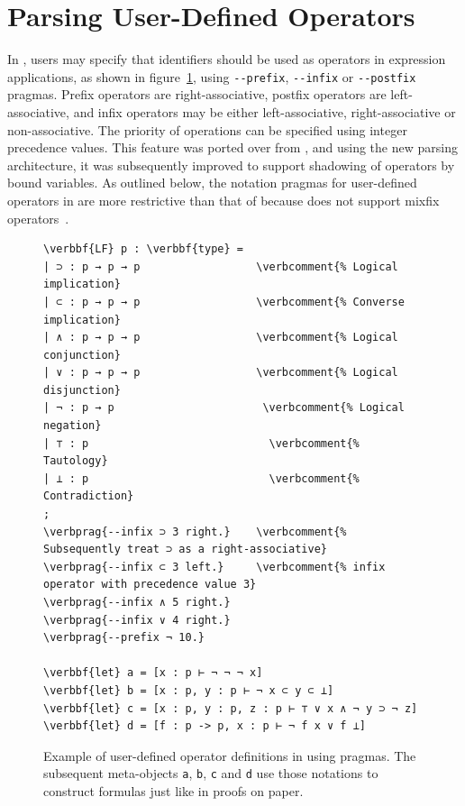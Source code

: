 

\section{Parsing User-Defined Operators}

In \Beluga, users may specify that identifiers should be used as operators in expression applications, as shown in figure~\ref{figure:operator-pragmas}, using \verb|--prefix|, \verb|--infix| or \verb|--postfix| pragmas.
Prefix operators are right-associative, postfix operators are left-associative, and infix operators may be either left-associative, right-associative or non-associative.
The priority of operations can be specified using integer precedence values.
This feature was ported over from \Twelf, and using the new parsing architecture, it was subsequently improved to support shadowing of operators by bound variables.
As outlined below, the notation pragmas for user-defined operators in \Beluga are more restrictive than that of \Agda because \Beluga does not support mixfix operators~\cite{danielsson2008parsing}.

\begin{figure}[H]
\begin{Verbatim}[commandchars=\\\{\}, baselinestretch=1]
\verbbf{LF} p : \verbbf{type} =
| ⊃ : p → p → p                  \verbcomment{% Logical implication}
| ⊂ : p → p → p                  \verbcomment{% Converse implication}
| ∧ : p → p → p                  \verbcomment{% Logical conjunction}
| ∨ : p → p → p                  \verbcomment{% Logical disjunction}
| ¬ : p → p                       \verbcomment{% Logical negation}
| ⊤ : p                            \verbcomment{% Tautology}
| ⊥ : p                            \verbcomment{% Contradiction}
;
\verbprag{--infix ⊃ 3 right.}    \verbcomment{% Subsequently treat ⊃ as a right-associative}
\verbprag{--infix ⊂ 3 left.}     \verbcomment{% infix operator with precedence value 3}
\verbprag{--infix ∧ 5 right.}
\verbprag{--infix ∨ 4 right.}
\verbprag{--prefix ¬ 10.}

\verbbf{let} a = [x : p ⊢ ¬ ¬ ¬ x]
\verbbf{let} b = [x : p, y : p ⊢ ¬ x ⊂ y ⊂ ⊥]
\verbbf{let} c = [x : p, y : p, z : p ⊢ ⊤ ∨ x ∧ ¬ y ⊃ ¬ z]
\verbbf{let} d = [f : p -> p, x : p ⊢ ¬ f x ∨ f ⊥]
\end{Verbatim}
\caption[Example of user-defined operator definitions in \Beluga using pragmas.]{%
Example of user-defined operator definitions in \Beluga using pragmas.
The subsequent meta-objects \texttt{a}, \texttt{b}, \texttt{c} and \texttt{d} use those notations to construct formulas just like in proofs on paper.
}
\label{figure:operator-pragmas}
\end{figure}

